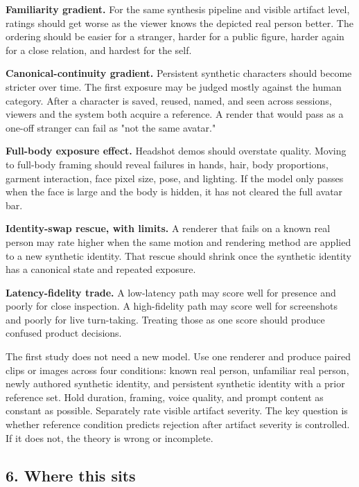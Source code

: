 \documentclass[
]{article}
\begin{document}
\textbf{Familiarity gradient.} For the same synthesis pipeline and
visible artifact level, ratings should get worse as the viewer knows the
depicted real person better. The ordering should be easier for a
stranger, harder for a public figure, harder again for a close relation,
and hardest for the self.

\textbf{Canonical-continuity gradient.} Persistent synthetic characters
should become stricter over time. The first exposure may be judged
mostly against the human category. After a character is saved, reused,
named, and seen across sessions, viewers and the system both acquire a
reference. A render that would pass as a one-off stranger can fail as
"not the same avatar."

\textbf{Full-body exposure effect.} Headshot demos should overstate
quality. Moving to full-body framing should reveal failures in hands,
hair, body proportions, garment interaction, face pixel size, pose, and
lighting. If the model only passes when the face is large and the body
is hidden, it has not cleared the full avatar bar.

\textbf{Identity-swap rescue, with limits.} A renderer that fails on a
known real person may rate higher when the same motion and rendering
method are applied to a new synthetic identity. That rescue should
shrink once the synthetic identity has a canonical state and repeated
exposure.

\textbf{Latency-fidelity trade.} A low-latency path may score well for
presence and poorly for close inspection. A high-fidelity path may score
well for screenshots and poorly for live turn-taking. Treating those as
one score should produce confused product decisions.

The first study does not need a new model. Use one renderer and produce
paired clips or images across four conditions: known real person,
unfamiliar real person, newly authored synthetic identity, and
persistent synthetic identity with a prior reference set. Hold duration,
framing, voice quality, and prompt content as constant as possible.
Separately rate visible artifact severity. The key question is whether
reference condition predicts rejection after artifact severity is
controlled. If it does not, the theory is wrong or incomplete.

\subsection{6. Where this sits}\label{6-where-this-sits}
\end{document}
